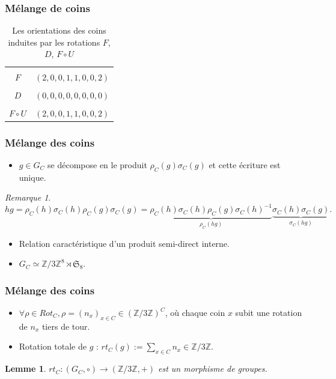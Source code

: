 \documentclass[10pt,notheorems]{beamer}
\theoremstyle{plain}
\theoremstyle{definition}
\theoremstyle{plain}
\theoremstyle{plain}
\newtheorem{lemma}{Lemme}
\theoremstyle{plain}
\theoremstyle{remark}
\newtheorem{remark}{Remarque}
\begin{document}
\begin{frame}
  \frametitle{Mélange de coins}
  \begin{table}
    \centering
    \begin{tabular}{|c|c|}
      \hline \\
      $ F$ & $(2,0,0,1,1,0,0,2)$ \\
      \hline \\
      $D$ & $(0,0,0,0,0,0,0,0)$  \\
      \hline \\
      $F \circ U$ & $ (2,0,0,1,1,0,0,2)$ \\
      \hline
    \end{tabular}
    \caption{Les orientations des coins induites par les rotations $F$, $D$, $F \circ U$}
    \label{}
  \end{table}
\end{frame}

\begin{frame}
  \frametitle{Mélange des coins}
  \begin{itemize}
    \item $g \in G_C$ se décompose en le produit $\rho_C(g) \sigma_C(g)$ et cette écriture est unique.
  \end{itemize}

  \begin{remark}
    \begin{equation*}
      hg = \rho_C(h) \sigma_C(h) \rho_C(g) \sigma_C(g) = \underbrace{\rho_C(h) \sigma_C(h) \rho_C(g) \sigma_C(h) ^{-1} }_{\rho_C(hg)} \underbrace{\sigma_C(h) \sigma_C(g)}_{\sigma_C(hg)}.
    \end{equation*}
  \end{remark}

  \begin{itemize}
    \item Relation caractéristique d'un produit semi-direct interne.
    \item $G_C \simeq \mathbb{Z}/{ 3 }\mathbb{Z} ^{8} \rtimes \mathfrak{S}_{8} $.
  \end{itemize}

\end{frame}

\begin{frame}
  \frametitle{Mélange des coins}
  \begin{itemize}
    \item $\forall \rho \in Rot_C, \rho = (n_x) _{x \in C} \in (\mathbb{Z}/{ 3 }\mathbb{Z}) ^{C}$, où chaque coin $x$ subit une rotation de $n_x$ tiers de tour.
    \item Rotation totale de $g$ : $rt_C(g) := \sum_{x \in C} n_x \in \mathbb{Z}/{ 3 }\mathbb{Z} $.
  \end{itemize}

  \begin{lemma}
    $rt_C : (G_C, \circ) \to (\mathbb{Z}/{ 3 }\mathbb{Z}, +)$ est un morphisme de groupes.
  \end{lemma}
\end{frame}
\end{document}
